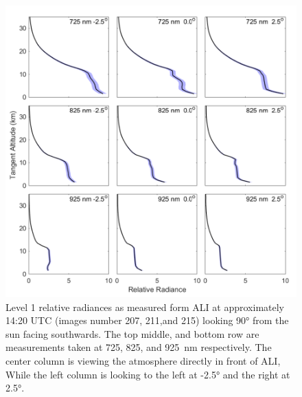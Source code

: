\documentclass[12pt]{article}
\begin{document}
\newpage

\begin{figure}
\includegraphics[width=1.0\textwidth]{./Images/5-2-AliRadiancesWithError.pdf}
    \caption{Level 1 relative radiances as measured form ALI at approximately 14:20 UTC (images number 207, 211,and 215) looking 90\si{\degree} from the sun facing southwards. The top middle, and bottom row are measurements taken at 725, 825, and 925~nm respectively. The center column is viewing the atmosphere directly in front of ALI, While the left column is looking to the left at -2.5\si{\degree} and the right at 2.5\si{\degree}. }
    \label{fig:AliRadiances}
\end{figure}

\newpage
\end{document}
